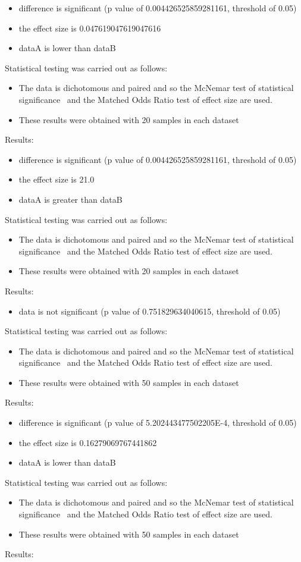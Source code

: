 \documentclass[]{article}
\begin{document}
\begin{itemize}
\item{difference is significant (p value of 0.004426525859281161, threshold of 0.05)}
\item{the effect size is 0.047619047619047616}
\item{dataA is lower than dataB}
\end{itemize}Statistical testing was carried out as follows: \begin{itemize}
\item{The data is dichotomous and paired and so the McNemar test of statistical significance~\cite{Gibbons2011} and the Matched Odds Ratio test of effect size are used.}
\item{These results were obtained with 20 samples in each dataset}
\end{itemize}Results:
\begin{itemize}
\item{difference is significant (p value of 0.004426525859281161, threshold of 0.05)}
\item{the effect size is 21.0}
\item{dataA is greater than dataB}
\end{itemize}Statistical testing was carried out as follows: \begin{itemize}
\item{The data is dichotomous and paired and so the McNemar test of statistical significance~\cite{Gibbons2011} and the Matched Odds Ratio test of effect size are used.}
\item{These results were obtained with 20 samples in each dataset}
\end{itemize}Results:
\begin{itemize}
\item{data is not significant (p value of 0.751829634040615, threshold of 0.05)}
\end{itemize}Statistical testing was carried out as follows: \begin{itemize}
\item{The data is dichotomous and paired and so the McNemar test of statistical significance~\cite{Gibbons2011} and the Matched Odds Ratio test of effect size are used.}
\item{These results were obtained with 50 samples in each dataset}
\end{itemize}Results:
\begin{itemize}
\item{difference is significant (p value of 5.202443477502205E-4, threshold of 0.05)}
\item{the effect size is 0.16279069767441862}
\item{dataA is lower than dataB}
\end{itemize}Statistical testing was carried out as follows: \begin{itemize}
\item{The data is dichotomous and paired and so the McNemar test of statistical significance~\cite{Gibbons2011} and the Matched Odds Ratio test of effect size are used.}
\item{These results were obtained with 50 samples in each dataset}
\end{itemize}Results:
\end{document}
